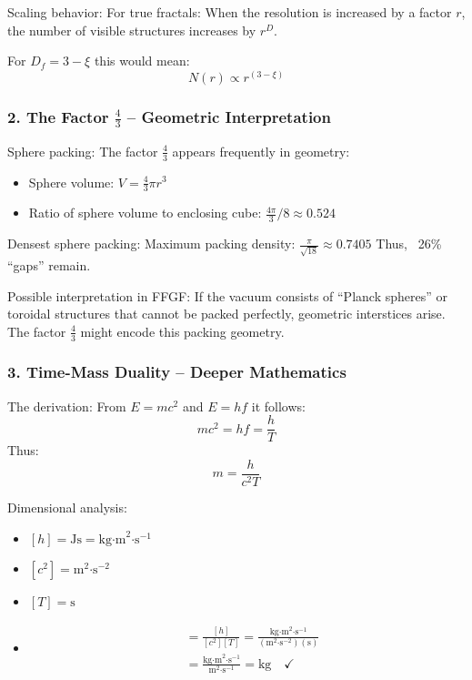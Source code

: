 \documentclass[12pt,a4paper]{article}
\begin{document}
	Scaling behavior:
	For true fractals: When the resolution is increased by a factor \( r \), the number of visible structures increases by \( r^D \).
	
	For \( D_f = 3 - \xi \) this would mean:
	\[
	N(r) \propto r^{(3-\xi)}
	\]
	
	\subsubsection{2. The Factor \( \frac{4}{3} \) – Geometric Interpretation}
	Sphere packing:
	The factor \( \frac{4}{3} \) appears frequently in geometry:
	\begin{itemize}
		\item Sphere volume: \( V = \frac{4}{3}\pi r^3 \)
		\item Ratio of sphere volume to enclosing cube: \( \frac{4\pi}{3}/8 \approx 0.524 \)
	\end{itemize}
	
	Densest sphere packing:
	Maximum packing density: \( \frac{\pi}{\sqrt{18}} \approx 0.7405 \)
	Thus, ~26\% ``gaps'' remain.
	
	Possible interpretation in FFGF:
	If the vacuum consists of ``Planck spheres'' or toroidal structures that cannot be packed perfectly, geometric interstices arise. The factor \( \frac{4}{3} \) might encode this packing geometry.
	
	\subsubsection{3. Time-Mass Duality – Deeper Mathematics}
	The derivation:
	From \( E = mc^2 \) and \( E = hf \) it follows:
	\[
	mc^2 = hf = \frac{h}{T}
	\]
	Thus:
	\[
	m = \frac{h}{c^2 T}
	\]
	
	Dimensional analysis:
	\begin{itemize}
		\item \( [h] = \text{Js} = \text{kg·m}^2\text{·s}^{-1} \)
		\item \( [c^2] = \text{m}^2\text{·s}^{-2} \)
		\item \( [T] = \text{s} \)
		\item \begin{align}
			[m] &= \frac{[h]}{[c^2][T]} = \frac{\text{kg·m}^2\text{·s}^{-1}}{(\text{m}^2\text{·s}^{-2})(\text{s})} \\
			&= \frac{\text{kg·m}^2\text{·s}^{-1}}{\text{m}^2\text{·s}^{-1}} = \text{kg} \quad \checkmark
		\end{align}
	\end{itemize}
	
\end{document}
